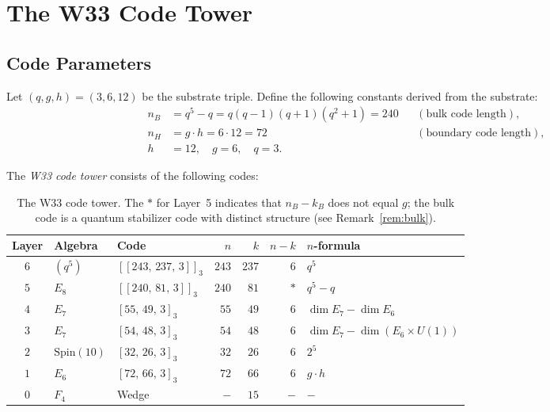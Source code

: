 \documentclass[12pt]{article}
\begin{document}
\section{The W33 Code Tower}\label{sec:tower}

\subsection{Code Parameters}

Let $(q, g, h) = (3, 6, 12)$ be the substrate triple.
Define the following constants derived from the substrate:
\begin{align*}
 n_B &= q^5 - q = q(q-1)(q+1)(q^2+1) = 240 & &(\text{bulk code length}), \\
 n_H &= g \cdot h = 6 \cdot 12 = 72 & &(\text{boundary code length}), \\
 h &= 12, \quad g = 6, \quad q = 3.
\end{align*}

The \emph{W33 code tower} consists of the following codes:

\begin{table}[h!]
\centering
\renewcommand{\arraystretch}{1.3}
\begin{tabular}{cllrrrl}
\toprule
Layer & Algebra & Code & $n$ & $k$ & $n-k$ & $n$-formula \\
\midrule
$6$ & $(q^5)$ & $[[243,\,237,\,3]]_3$ & $243$ & $237$ & $6$ & $q^5$ \\
$5$ & $E_8$ & $[[240,\,81,\,3]]_3$ & $240$ & $81$ & $*$ & $q^5 - q$ \\
$4$ & $E_7$ & $[55,\,49,\,3]_3$ & $55$ & $49$ & $6$ & $\dim E_7 - \dim E_6$ \\
$3$ & $E_7$ & $[54,\,48,\,3]_3$ & $54$ & $48$ & $6$ & $\dim E_7 - \dim(E_6{\times}U(1))$ \\
$2$ & $\mathrm{Spin}(10)$ & $[32,\,26,\,3]_3$ & $32$ & $26$ & $6$ & $2^5$ \\
$1$ & $E_6$ & $[72,\,66,\,3]_3$ & $72$ & $66$ & $6$ & $g \cdot h$ \\
$0$ & $F_4$ & Wedge & $-$ & $15$ & $-$ & $-$ \\
\bottomrule
\end{tabular}
\caption{The W33 code tower. The $*$ for Layer~5 indicates that $n_B - k_B$
does not equal $g$; the bulk code is a quantum stabilizer code with
distinct structure (see Remark~\ref{rem:bulk}).}
\label{tab:tower}
\end{table}
\end{document}
